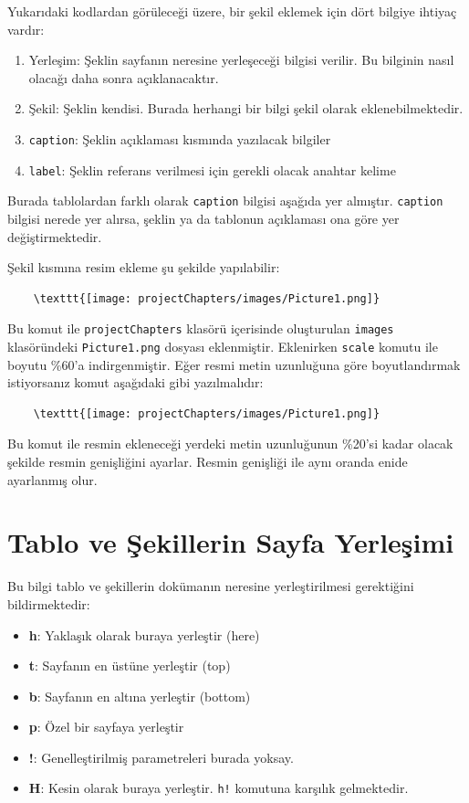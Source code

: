 Yukarıdaki kodlardan görüleceği üzere, bir şekil eklemek için dört bilgiye ihtiyaç vardır: 

\begin{enumerate}
    \item Yerleşim: Şeklin sayfanın neresine yerleşeceği bilgisi verilir. Bu bilginin nasıl olacağı daha sonra açıklanacaktır.
    \item Şekil: Şeklin kendisi. Burada herhangi bir bilgi şekil olarak eklenebilmektedir.
    \item \texttt{caption}: Şeklin açıklaması kısmında yazılacak bilgiler
    \item \texttt{label}: Şeklin referans verilmesi için gerekli olacak anahtar kelime
\end{enumerate}

Burada tablolardan farklı olarak \texttt{caption} bilgisi aşağıda yer almıştır. \texttt{caption} bilgisi nerede yer alırsa, şeklin ya da tablonun açıklaması ona göre yer değiştirmektedir.

Şekil kısmına resim ekleme şu şekilde yapılabilir:

\begin{verbatim}
    \texttt{[image: projectChapters/images/Picture1.png]}
\end{verbatim}

Bu komut ile \texttt{projectChapters} klasörü içerisinde oluşturulan \texttt{images} klasöründeki \texttt{Picture1.png} dosyası eklenmiştir. Eklenirken \texttt{scale} komutu ile boyutu \%60'a indirgenmiştir. Eğer resmi metin uzunluğuna göre boyutlandırmak istiyorsanız komut aşağıdaki gibi yazılmalıdır:

\begin{verbatim}
    \texttt{[image: projectChapters/images/Picture1.png]}
\end{verbatim}

Bu komut ile resmin ekleneceği yerdeki metin uzunluğunun \%20'si kadar olacak şekilde resmin genişliğini ayarlar. Resmin genişliği ile aynı oranda enide ayarlanmış olur. 

\section{Tablo ve Şekillerin Sayfa Yerleşimi}
Bu bilgi tablo ve şekillerin dokümanın neresine yerleştirilmesi gerektiğini bildirmektedir:

\begin{itemize}
    \item \textbf{h}: Yaklaşık olarak buraya yerleştir (here)
    \item \textbf{t}: Sayfanın en üstüne yerleştir (top)
    \item \textbf{b}: Sayfanın en altına yerleştir (bottom)
    \item \textbf{p}: Özel bir sayfaya yerleştir
    \item \textbf{!}: Genelleştirilmiş parametreleri burada yoksay.
    \item \textbf{H}: Kesin olarak buraya yerleştir. \texttt{h!} komutuna karşılık gelmektedir.
\end{itemize}

